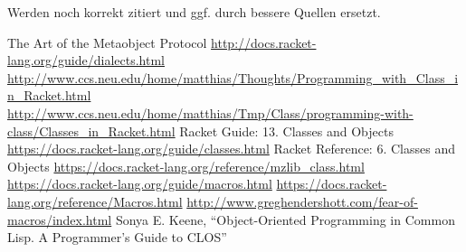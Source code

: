Werden noch korrekt zitiert und ggf. durch bessere Quellen ersetzt.
\begin{thebibliography}{}
  The Art of the Metaobject Protocol 
  \url{http://docs.racket-lang.org/guide/dialects.html}
  \url{http://www.ccs.neu.edu/home/matthias/Thoughts/Programming\_with\_Class\_in\_Racket.html}
  \url{http://www.ccs.neu.edu/home/matthias/Tmp/Class/programming-with-class/Classes\_in\_Racket.html}
  Racket Guide: 13. Classes and Objects \url{https://docs.racket-lang.org/guide/classes.html}
  Racket Reference: 6. Classes and Objects \url{https://docs.racket-lang.org/reference/mzlib\_class.html}
  \url{https://docs.racket-lang.org/guide/macros.html}
  \url{https://docs.racket-lang.org/reference/Macros.html}
  \url{http://www.greghendershott.com/fear-of-macros/index.html}
  Sonya E. Keene, ``Object-Oriented Programming in Common Lisp. A Programmer's Guide to CLOS''
\end{thebibliography}

\cleardoublepage